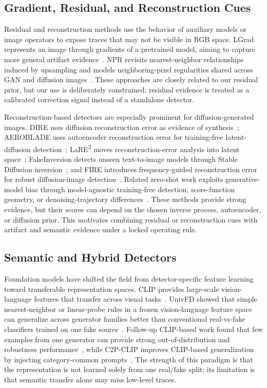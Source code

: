 \documentclass[lettersize,journal]{IEEEtran}
\begin{document}
\subsection{Gradient, Residual, and Reconstruction Cues}
Residual and reconstruction methods use the behavior of auxiliary models or image operators to expose traces that may not be visible in RGB space. LGrad represents an image through gradients of a pretrained model, aiming to capture more general artifact evidence~\cite{tan2023lgrad}. NPR revisits nearest-neighbor relationships induced by upsampling and models neighboring-pixel regularities shared across GAN and diffusion images~\cite{tan2024npr}. These approaches are closely related to our residual prior, but our use is deliberately constrained: residual evidence is treated as a calibrated correction signal instead of a standalone detector.

Reconstruction-based detectors are especially prominent for diffusion-generated images. DIRE uses diffusion reconstruction error as evidence of synthesis~\cite{wang2023dire}; AEROBLADE uses autoencoder reconstruction error for training-free latent-diffusion detection~\cite{ricker2024aeroblade}; LaRE\textsuperscript{2} moves reconstruction-error analysis into latent space~\cite{luo2024lare2}; FakeInversion detects unseen text-to-image models through Stable Diffusion inversion~\cite{cazenavette2024fakeinversion}; and FIRE introduces frequency-guided reconstruction error for robust diffusion-image detection~\cite{chu2025fire}. Related zero-shot work exploits generative-model bias through model-agnostic training-free detection, score-function geometry, or denoising-trajectory differences~\cite{he2024rigid,brokman2025manifold,liang2025trajectory}. These methods provide strong evidence, but their scores can depend on the chosen inverse process, autoencoder, or diffusion prior. This motivates combining residual or reconstruction cues with artifact and semantic evidence under a locked operating rule.

\subsection{Semantic and Hybrid Detectors}
Foundation models have shifted the field from detector-specific feature learning toward transferable representation spaces. CLIP provides large-scale vision-language features that transfer across visual tasks~\cite{radford2021clip}. UnivFD showed that simple nearest-neighbor or linear-probe rules in a frozen vision-language feature space can generalize across generator families better than conventional real-vs-fake classifiers trained on one fake source~\cite{ojha2023univfd}. Follow-up CLIP-based work found that few examples from one generator can provide strong out-of-distribution and robustness performance~\cite{cozzolino2024clip}, while C2P-CLIP improves CLIP-based generalization by injecting category-common prompts~\cite{tan2025c2pclip}. The strength of this paradigm is that the representation is not learned solely from one real/fake split; its limitation is that semantic transfer alone may miss low-level traces.
\end{document}
